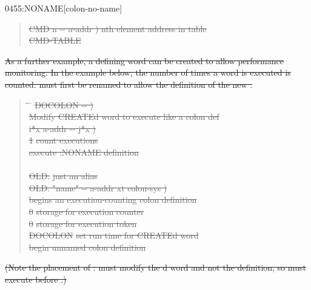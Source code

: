 \begin{worddef}{0455}{:NONAME}[colon-no-name]
\begin{rationale}
\begin{quote}
			\sout{\word{:} CMD  n -{}- a-addr )
				 nth element address in table} \\
			\tab \sout{ CMD-TABLE \word{+}
			\word{;}}
		\end{quote}

\sout{%
		As a further example, a defining word can be created to allow
		performance monitoring. In the example below, the number of
		times a word is executed is counted. \word{:} must first be
		renamed to allow the definition of the new \word{;}.}

		\begin{quote}\ttfamily
		  \begin{tabbing}
			\tab \= \tab \= \hspace*{12em} \= \kill
			\sout{\word{:} DOCOLON  -{}- )} \\
			\+ \sout{ Modify CREATEd word to execute like a colon def} \\
				\+ \sout{  i*x a-addr -{}- j*x )} \\
					\sout{1  \word{+!}}								\> \sout{ count executions} \\
			\-	\-	\sout{  }				\> \sout{ execute :NONAME definition} \\
			\sout{\word{;}} \\[1.5\parskip]

			\sout{\word{:} OLD: \word{:} \word{;}}								\>\>\> \sout{ just an alias} \\[1.5\parskip]

			\sout{OLD: \word{:}  "name" -{}- a-addr xt colon-sys )} \\
			\+ \sout{ begins an execution-counting colon definition} \\
				\sout{  0 \word{,}}					\>\> \sout{ storage for execution counter} \\
				\sout{0 \word{,}}												\>\> \sout{\word{bs} storage for execution token} \\
				\sout{DOCOLON}													\>\> \sout{ set run time for CREATEd word} \\
			\-	\sout{}											\>\> \sout{ begin unnamed colon definition} \\
			\sout{\word{;}}
		  \end{tabbing}
		\end{quote}

\sout{%
		(Note the placement of :  must modify
		the d word and not the  definition,
		so  must execute before .)}


\end{rationale}
\end{worddef}
